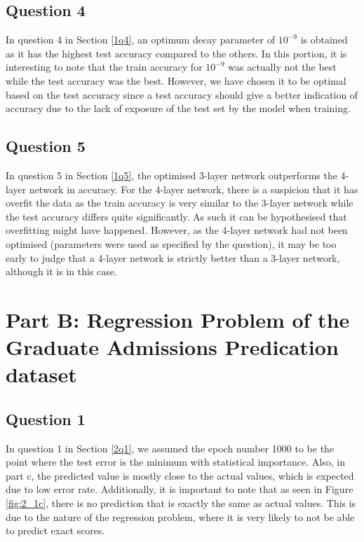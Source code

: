 \subsection{Question 4}
In question 4 in Section \ref{1q4}, an optimum decay parameter of $10^{-9}$ is obtained as it has the highest test accuracy compared to the others. In this portion, it is interesting to note that the train accuracy for $10^{-9}$ was actually not the best while the test accuracy was the best. However, we have chosen it to be optimal based on the test accuracy since a test accuracy should give a better indication of accuracy due to the lack of exposure of the test set by the model when training.

\subsection{Question 5}
In question 5 in Section \ref{1q5}, the optimised 3-layer network outperforms the 4-layer network in accuracy. For the 4-layer network, there is a suspicion that it has overfit the data as the train accuracy is very similar to the 3-layer network while the test accuracy differs quite significantly. As such it can be hypothesised that overfitting might have happened. However, as the 4-layer network had not been optimised (parameters were used as specified by the question), it may be too early to judge that a 4-layer network is strictly better than a 3-layer network, although it is in this case.

\section{Part B: Regression Problem of the Graduate Admissions Predication dataset}
\subsection{Question 1}
In question 1 in Section \ref{2q1}, we assumed the epoch number 1000 to be the point where the test error is the minimum with statistical importance. Also, in part c, the predicted value is mostly close to the actual values, which is expected due to low error rate. Additionally, it is important to note that as seen in Figure \ref{fig:2_1c}, there is no prediction that is exactly the same as actual values. This is due to the nature of the regression problem, where it is very likely to not be able to predict exact scores.

